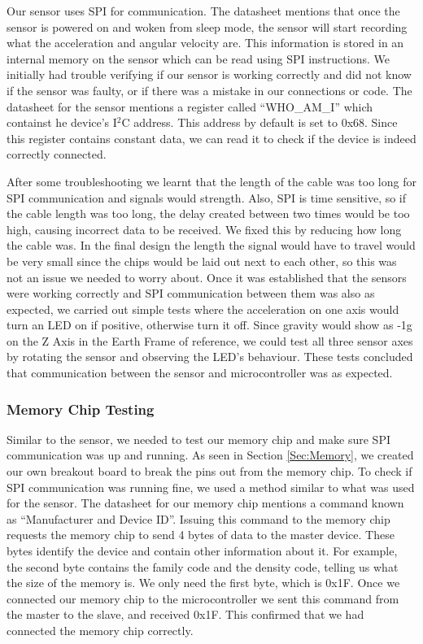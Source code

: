 Our sensor uses SPI for communication.
The datasheet mentions that once the sensor is powered on and woken from sleep mode,
the sensor will start recording what the acceleration and angular velocity are.
This information is stored in an internal memory on the sensor which can be read using SPI instructions.
We initially had trouble verifying if our sensor is working correctly and did not know if the sensor was faulty,
or if there was a mistake in our connections or code.
The datasheet for the sensor mentions a register called ``WHO\_AM\_I'' which containst he device's I$^2$C address.
This address by default is set to 0x68.
Since this register contains constant data, we can read it to check if the device is indeed correctly connected.

After some troubleshooting we learnt that the length of the cable was too long for SPI communication and signals would strength.
Also, SPI is time sensitive, so if the cable length was too long,
the delay created between two times would be too high,
causing incorrect data to be received.
We fixed this by reducing how long the cable was.
In the final design the length the signal would have to travel would be very small since the chips would be laid out next to each other,
so this was not an issue we needed to worry about.
Once it was established that the sensors were working correctly and SPI communication between them was also as expected,
we carried out simple tests where the acceleration on one axis would turn an LED on if positive,
otherwise turn it off.
Since gravity would show as -1g on the Z Axis in the Earth Frame of reference,
we could test all three sensor axes by rotating the sensor and observing the LED's behaviour.
These tests concluded that communication between the sensor and microcontroller was as expected.

\subsubsection{Memory Chip Testing}
\label{Sec:MemoryTesting}
Similar to the sensor, we needed to test our memory chip and make sure SPI communication was up and running.
As seen in Section \ref{Sec:Memory},
we created our own breakout board to break the pins out from the memory chip.
To check if SPI communication was running fine,
we used a method similar to what was used for the sensor.
The datasheet for our memory chip mentions a command known as ``Manufacturer and Device ID''.
Issuing this command to the memory chip requests the memory chip to send 4 bytes of data to the master device.
These bytes identify the device and contain other information about it. 
For example, the second byte contains the family code and the density code,
telling us what the size of the memory is.
We only need the first byte, which is 0x1F.
Once we connected our memory chip to the microcontroller we sent this command from the master to the slave,
and received 0x1F.
This confirmed that we had connected the memory chip correctly.

